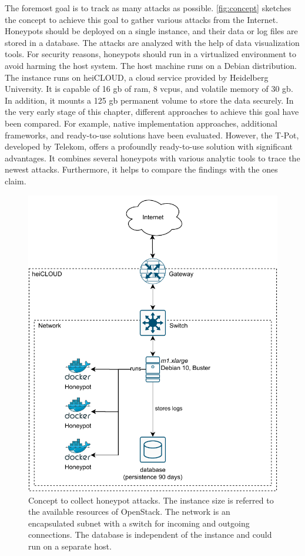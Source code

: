 The foremost goal is to track as many attacks as possible.
\autoref{fig:concept} sketches the concept to achieve this goal to gather various attacks from the Internet.
Honeypots should be deployed on a single instance, and their data or log files are stored in a database.
The attacks are analyzed with the help of data visualization tools.
For security reasons, honeypots should run in a virtualized environment to avoid harming the host system.
The host machine runs on a Debian distribution.
The instance runs on heiCLOUD, a cloud service provided by Heidelberg University.
It is capable of 16 \acs{gb} of \acs{ram}, 8 \acsp{vcpu}, and volatile memory of 30 \acs{gb}.
In addition, it mounts a 125 \acs{gb} permanent volume to store the data securely.
In the very early stage of this chapter, different approaches to achieve this goal have been compared.
For example, native implementation approaches, additional frameworks, and ready-to-use solutions have been evaluated.
However, the T-Pot, developed by Telekom, offers a profoundly ready-to-use solution with significant advantages.
It combines several honeypots with various analytic tools to trace the newest attacks.
Furthermore, it helps to compare the findings with the ones \citet{Kelly2021} claim.

\begin{figure}[htbp]
    \centering
    \includegraphics{figures/tpot-concept.pdf}
    \caption[Concept to collect honeypot attacks]{
        Concept to collect honeypot attacks.
        The instance size is referred to the available resources of OpenStack.
        The network is an encapsulated subnet with a switch for incoming and outgoing connections.
        The database is independent of the instance and could run on a separate host.
    }
    \label{fig:concept}
\end{figure}

